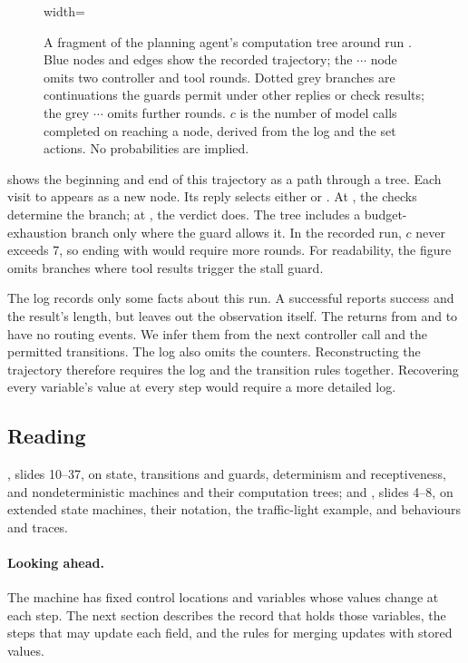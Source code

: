 \begin{figure}[tbp]
  \centering
  \begin{adjustbox}{width=\linewidth}\end{adjustbox}
  \caption{A fragment of the planning agent's computation tree around run . Blue nodes
  and edges show the recorded trajectory; the $\cdots$ node omits two controller and tool rounds.
  Dotted grey branches are continuations the guards permit under other replies or check results;
  the grey $\cdots$ omits further rounds. $c$ is the number of model calls completed on reaching a
  node, derived from the log and the set actions. No probabilities are implied.}
  \label{fig:efsm-trace-tree}
\end{figure}

 shows the beginning and end of this trajectory as a path through a
tree. Each visit to  appears as a new node. Its reply selects either
 or . At , the checks determine the branch; at
, the verdict does. The tree includes a budget-exhaustion branch only where the
guard allows it. In the recorded run, $c$ never exceeds 7, so ending with
 would require more rounds. For readability, the figure omits branches
where tool results trigger the stall guard.

The log records only some facts about this run. A successful  reports
success and the result's length, but leaves out the observation itself. The returns from
 and  to  have no routing events. We infer them
from the next controller call and the permitted transitions. The log also omits the counters.
Reconstructing the trajectory therefore requires the log and the transition rules together.
Recovering every variable's value at every step would require a more detailed log.

\subsection{Reading}

\citet{seshia2015discrete}, slides 10--37, on state, transitions and guards,
determinism and receptiveness, and nondeterministic machines and their computation trees; and
\citet{seshia2015extended}, slides 4--8, on extended state machines, their notation, the
traffic-light example, and behaviours and traces.

\paragraph{Looking ahead.} The machine has fixed control locations and variables whose values
change at each step. The next section describes the record that holds those variables, the steps
that may update each field, and the rules for merging updates with stored values.
